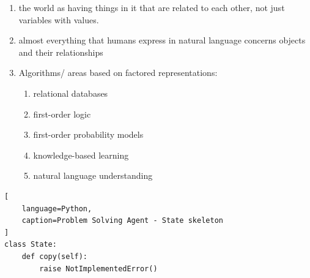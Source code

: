 \begin{enumerate}
    \item the world as having things in it that are related to each other, not just variables with values.
    \hfill \cite{ai/book/Artificial-Intelligence-A-Modern-Approach/Russell-Norvig}

    \item almost everything that humans express in natural language concerns objects and their relationships
    \hfill \cite{ai/book/Artificial-Intelligence-A-Modern-Approach/Russell-Norvig}

    \item Algorithms/ areas based on factored representations:
    \begin{enumerate}
        \item relational databases
        \hfill \cite{ai/book/Artificial-Intelligence-A-Modern-Approach/Russell-Norvig}

        \item first-order logic
        \hfill \cite{ai/book/Artificial-Intelligence-A-Modern-Approach/Russell-Norvig}

        \item first-order probability models
        \hfill \cite{ai/book/Artificial-Intelligence-A-Modern-Approach/Russell-Norvig}

        \item knowledge-based learning
        \hfill \cite{ai/book/Artificial-Intelligence-A-Modern-Approach/Russell-Norvig}

        \item natural language understanding
        \hfill \cite{ai/book/Artificial-Intelligence-A-Modern-Approach/Russell-Norvig}
    \end{enumerate}
\end{enumerate}




\begin{lstlisting}[
    language=Python,
    caption=Problem Solving Agent - State skeleton
]
class State:
    def copy(self):
        raise NotImplementedError()
\end{lstlisting}






